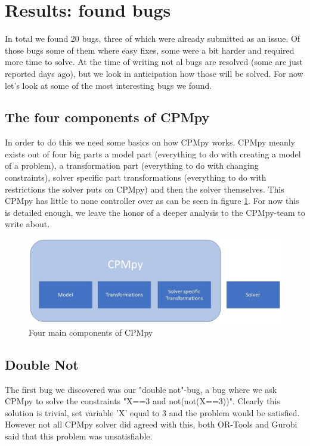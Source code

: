 \section{Results: found bugs}
\label{res:bugs}
In total we found 20 bugs, three of which were already submitted as an issue. Of those bugs some of them where easy fixes, some were a bit harder and required more time to solve. At the time of writing not al bugs are resolved (some are just reported days ago), but we look in anticipation how those will be solved. For now let's look at some of the most interesting bugs we found. 

\subsection{The four components of CPMpy}
\label{res:bugs:ComponentsCpMpy}
In order to do this we need some basics on how CPMpy works. CPMpy meanly exists out of four big parts a model part (everything to do with creating a model of a problem), a transformation part (everything to do with changing constraints), solver specific part transformations (everything to do with restrictions the solver puts on CPMpy) and then the solver themselves. This CPMpy has little to none controller over as can be seen in figure \ref{fig:4ComponentsOfCPMpy}. For now this is detailed enough, we leave the honor of a deeper analysis to the CPMpy-team to write about.

\begin{figure}
	\centering
	\includegraphics[width=1.0\textwidth]{images/4componentsOfCPMpy}
	\caption{Four main components of CPMpy}
	\label{fig:4ComponentsOfCPMpy}
\end{figure}


\subsection{Double Not}
\label{res:bug:DoubleNot}
The first bug we discovered was our "double not"-bug, a bug where we ask CPMpy to solve the constraints "X==3 and not(not(X==3))". Clearly this solution is trivial, set variable 'X' equal to 3 and the problem would be satisfied. However not all CPMpy solver did agreed with this, both OR-Tools and Gurobi said that this problem was unsatisfiable. 

